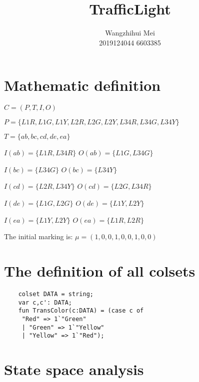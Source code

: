 \documentclass[12pt]{article}%
\begin{document}
\title{TrafficLight}
\author{Wangzhihui Mei \\ 2019124044 6603385}
\date{}
\maketitle

\section*{Mathematic definition}
\noindent
$C=(P,T,I,O)$

\noindent$P=\{L1R,L1G,L1Y,L2R,L2G,L2Y,L34R,L34G,L34Y\}$

\noindent$T=\{ab,bc,cd,de,ea\}$

\noindent$I(ab)=\{L1R,L34R\}$ $O(ab)=\{L1G,L34G\}$

\noindent$I(bc)=\{L34G\}$ $O(bc)=\{L34Y\}$

\noindent$I(cd)=\{L2R,L34Y\}$ $O(cd)=\{L2G,L34R\}$

\noindent$I(de)=\{L1G,L2G\}$ $O(de)=\{L1Y,L2Y\}$

\noindent$I(ea)=\{L1Y,L2Y\}$ $O(ea)=\{L1R,L2R\}$

\noindent The initial marking is:
$\mu=(1,0,0,1,0,0,1,0,0)$


\section*{The definition of all colsets}

\begin{lstlisting}
    colset DATA = string;
    var c,c': DATA;
    fun TransColor(c:DATA) = (case c of
     "Red" => 1`"Green"
     | "Green" => 1`"Yellow"
     | "Yellow" => 1`"Red");
\end{lstlisting}

\section*{State space analysis}
\end{document}
